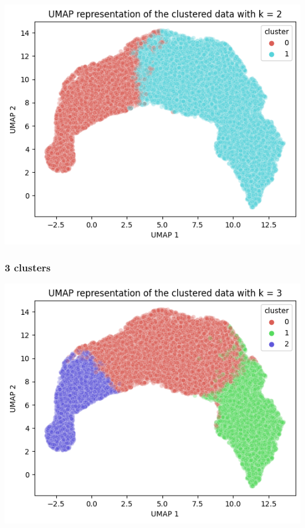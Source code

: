 \documentclass{article}
\begin{document}
\begin{center}
    \includegraphics[scale=0.5]{./img/umap_2.png}
\end{center}

\subsubsection*{3 clusters}

\begin{center}
    \includegraphics[scale=0.5]{./img/umap_3.png}
\end{center}
\end{document}
